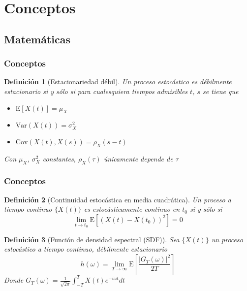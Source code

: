 \documentclass{beamer}
\newtheorem{defn}{Definici\'on}
\newcommand{\E}[1]{\mathrm{E}\left[ #1 \right]}
\newcommand{\Var}[1]{\mathrm{Var}\left( #1 \right)}
\newcommand{\Cov}[1]{\mathrm{Cov}\left( #1 \right)}
\begin{document}

\section{Conceptos}


\subsection{Matem\'aticas}

\begin{frame}\frametitle{Conceptos}
\begin{defn}[Estacionariedad d\'ebil]
Un proceso estoc\'astico es d\'ebilmente estacionario si y s\'olo si para cualesquiera tiempos 
admisibles $t$, $s$ se tiene que
\begin{itemize}
\item $\E{X(t)} = \mu_X$
\item $\Var{X(t)} = \sigma^{2}_X$
\item $\Cov{X(t),X(s)} = \rho_X (s-t)$
\end{itemize}
Con $\mu_X$, $\sigma^{2}_X$ constantes, $\rho_X(\tau)$ \'unicamente depende de $\tau$
\end{defn}
\end{frame}


\begin{frame}\frametitle{Conceptos}
\begin{defn}[Continuidad estoc\'astica en media cuadr\'atica]
Un proceso a tiempo continuo $\{ X(t) \}$ es estoc\'asticamente continuo en $t_0$ si y s\'olo si
\begin{equation*}
\lim_{t \rightarrow t_0} \E{\left( X\left(t\right) - X\left(t_0\right) \right)^{2}} = 0
\end{equation*}
\end{defn}

\begin{defn}[Funci\'on de densidad espectral (SDF)]
Sea $\{X(t)\}$ un proceso estoc\'astico a tiempo continuo, d\'ebilmente estacionario
\begin{equation*}
h(\omega) = \lim_{T\rightarrow \infty} \E{ \frac{ \left| G_T(\omega) \right|^{2}}{2 T} }
\end{equation*}
Donde $\displaystyle G_T (\omega) = \frac{1}{\sqrt{2 \pi}} \int_{-T}^{T} X(t) e^{-i \omega t} dt$
\end{defn}
\end{frame}
\end{document}
